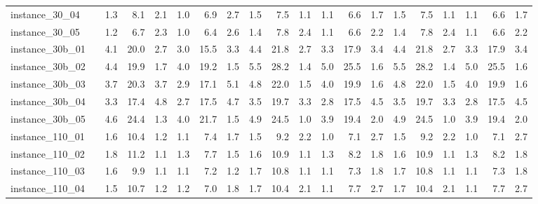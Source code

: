\documentclass[12pt,a4paper,openright,twoside]{book}
\begin{document}
\begin{table}[H]
{\begin{tabular}{|ll|rrrrrr|rrrrrr|rrrrrr|}
 instance\_30\_04             &     &    1.3  &   8.1  &  2.1  &   1.0  &   6.9  &  2.7    &    1.5  &   7.5  &  1.1  &   1.1  &   6.6  &  1.7  &    1.5  &   7.5  &  1.1  &   1.1  &   6.6  &  1.7   \\ 
 instance\_30\_05             &     &    1.2  &   6.7  &  2.3  &   1.0  &   6.4  &  2.6    &    1.4  &   7.8  &  2.4  &   1.1  &   6.6  &  2.2  &    1.4  &   7.8  &  2.4  &   1.1  &   6.6  &  2.2   \\ 
 instance\_30b\_01             &     &    4.1  &   20.0  &  2.7  &   3.0  &   15.5  &  3.3  &    4.4  &   21.8  &  2.7  &   3.3  &   17.9  &  3.4  &     4.4  &   21.8  &  2.7  &   3.3  &   17.9  &  3.4   \\ 
 instance\_30b\_02             &     &    4.4  &   19.9  &  1.7  &   4.0  &   19.2  &  1.5  &    5.5  &   28.2  &  1.4  &   5.0  &   25.5  &  1.6  &     5.5  &   28.2  &  1.4  &   5.0  &   25.5  &  1.6   \\ 
 instance\_30b\_03             &     &    3.7  &   20.3  &  3.7  &   2.9  &   17.1  &  5.1  &    4.8  &   22.0  &  1.5  &   4.0  &   19.9  &  1.6  &     4.8  &   22.0  &  1.5  &   4.0  &   19.9  &  1.6   \\ 
 instance\_30b\_04             &     &    3.3  &   17.4  &  4.8  &   2.7  &   17.5  &  4.7  &    3.5  &   19.7  &  3.3  &   2.8  &   17.5  &  4.5  &     3.5  &   19.7  &  3.3  &   2.8  &   17.5  &  4.5   \\ 
 instance\_30b\_05             &     &    4.6  &   24.4  &  1.3  &   4.0  &   21.7  &  1.5  &    4.9  &   24.5  &  1.0  &   3.9  &   19.4  &  2.0  &     4.9  &   24.5  &  1.0  &   3.9  &   19.4  &  2.0   \\ 
 instance\_110\_01            &     &    1.6  &   10.4  &  1.2  &   1.1  &   7.4  &  1.7   &    1.5  &   9.2  &  2.2  &   1.0  &   7.1  &  2.7  &     1.5  &   9.2  &  2.2  &   1.0  &   7.1  &  2.7    \\  
 instance\_110\_02            &     &    1.8  &   11.2  &  1.1  &   1.3  &   7.7  &  1.5   &    1.6  &   10.9  &  1.1  &   1.3  &   8.2  &  1.8  &      1.6  &   10.9  &  1.1  &   1.3  &   8.2  &  1.8    \\  
 instance\_110\_03            &     &    1.6  &   9.9  &  1.1  &   1.1  &   7.2  &  1.2    &    1.7  &   10.8  &  1.1  &   1.1  &   7.3  &  1.8  &      1.7  &   10.8  &  1.1  &   1.1  &   7.3  &  1.8    \\  
 instance\_110\_04            &     &    1.5  &   10.7  &  1.2  &   1.2  &   7.0  &  1.8   &    1.7  &   10.4  &  2.1  &   1.1  &   7.7  &  2.7  &      1.7  &   10.4  &  2.1  &   1.1  &   7.7  &  2.7    \\  

\end{tabular}}
\end{table}
\end{document}
